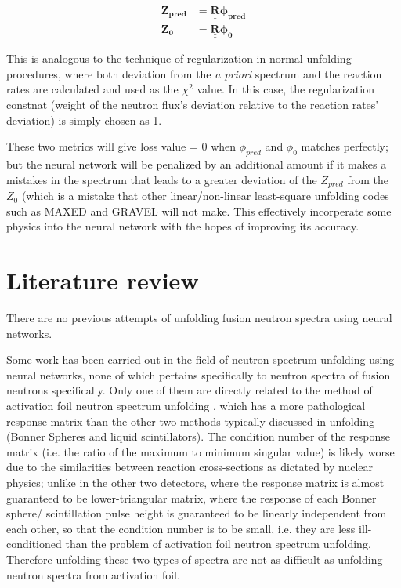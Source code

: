 \documentclass[a4paper, 12pt]{article}
\newcommand{\matr}[1]{\underline{\underline{\textbf{#1}}}}
\newcommand{\ve}[1]{\boldsymbol{#1}}
\begin{document}
    \begin{align}\label{unfolding general equation prediction}
        \ve{Z_{pred}} &= \matr{R} \ve{\phi_{pred} }\\
        \ve{Z_{0}} &= \matr{R} \ve{\phi_{0} }
    \end{align}

    This is analogous to the technique of regularization\cite{FisherRegularization} in normal unfolding procedures, where both deviation from the \emph{a priori} spectrum and the reaction rates are calculated and used as the $\chi^2$ value. In this case, the regularization constnat (weight of the neutron flux's deviation relative to the reaction rates' deviation) is simply chosen as 1.

    These two metrics will give loss value = 0 when $\phi_{pred}$ and $\phi_0$ matches perfectly; but the neural network will be penalized by an additional amount if it makes a mistakes in the spectrum that leads to a greater deviation of the $Z_{pred}$ from the $Z_{0}$ (which is a mistake that other linear/non-linear least-square unfolding codes such as MAXED and GRAVEL will not make. This effectively incorperate some physics into the neural network with the hopes of improving its accuracy.

\section{Literature review}\label{Literature review}
There are no previous attempts of unfolding fusion neutron spectra using neural networks.

Some work has been carried out in the field of neutron spectrum unfolding using neural networks, none of which pertains specifically to neutron spectra of fusion neutrons specifically. Only one of them are directly related to the method of activation foil neutron spectrum unfolding \cite{Accelerator-basedANNUnfolding}, which has a more pathological response matrix than the other two methods typically discussed in unfolding (Bonner Spheres and liquid scintillators). The condition number of the response matrix (i.e. the ratio of the maximum to minimum singular value\cite{MATLAB}) is likely worse due to the similarities between reaction cross-sections as dictated by nuclear physics; unlike in the other two detectors, where the response matrix is almost guaranteed to be lower-triangular matrix, where the response of each Bonner sphere/ scintillation pulse height is guaranteed to be linearly independent from each other, so that the condition number is to be small, i.e. they are less ill-conditioned than the problem of activation foil neutron spectrum unfolding. Therefore unfolding these two types of spectra are not as difficult as unfolding neutron spectra from activation foil.
\end{document}
